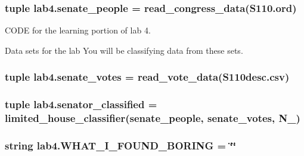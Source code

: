 \subsubsection[{senate\+\_\+people}]{\setlength{\rightskip}{0pt plus 5cm}tuple lab4.\+senate\+\_\+people = read\+\_\+congress\+\_\+data(\textquotesingle{}S110.\+ord\textquotesingle{})}\label{namespacelab4_ab431969dcbdc497ed29f78787174f64b}


C\+O\+D\+E for the learning portion of lab 4. 

Data sets for the lab You will be classifying data from these sets. \hypertarget{namespacelab4_ac5205d0d5639e598abd827580ff7f6ce}{}
\subsubsection[{senate\+\_\+votes}]{\setlength{\rightskip}{0pt plus 5cm}tuple lab4.\+senate\+\_\+votes = read\+\_\+vote\+\_\+data(\textquotesingle{}S110desc.\+csv\textquotesingle{})}\label{namespacelab4_ac5205d0d5639e598abd827580ff7f6ce}
\hypertarget{namespacelab4_a6fd54c2b5b11a8c2578c2777a6f47a35}{}
\subsubsection[{senator\+\_\+classified}]{\setlength{\rightskip}{0pt plus 5cm}tuple lab4.\+senator\+\_\+classified = {\bf limited\+\_\+house\+\_\+classifier}({\bf senate\+\_\+people}, {\bf senate\+\_\+votes}, {\bf N\+\_})}\label{namespacelab4_a6fd54c2b5b11a8c2578c2777a6f47a35}
\hypertarget{namespacelab4_a9ef9abf2d634215662582c7fae76fb2e}{}
\subsubsection[{W\+H\+A\+T\+\_\+\+I\+\_\+\+F\+O\+U\+N\+D\+\_\+\+B\+O\+R\+I\+N\+G}]{\setlength{\rightskip}{0pt plus 5cm}string lab4.\+W\+H\+A\+T\+\_\+\+I\+\_\+\+F\+O\+U\+N\+D\+\_\+\+B\+O\+R\+I\+N\+G = \char`\"{}\char`\"{}}\label{namespacelab4_a9ef9abf2d634215662582c7fae76fb2e}
\hypertarget{namespacelab4_ae3a183ad2ccdafaeb81264d2e04a7e71}{}
